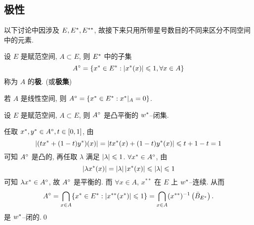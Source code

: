     \subsection{极性}
    以下讨论中因涉及 $ E, E^{*}, E^{**} $, 故接下来只用所带星号数目的不同来区分不同空间中的元素.

    \begin{Definition}[极]\label{def:极}
        设 $ E $ 是赋范空间, $ A\subset E $, 则 $ E^{*} $ 中的子集
        \[
            A^{\circ} = \{ x^{*}\in E^{*}:\left| x^{*}(x) \right| \leqslant1, \forall x\in A \}
        \]
        称为 $ A $ 的\textbf{极}. (或\textbf{极集})
    \end{Definition}

    \begin{Remark}
        若 $ A $ 是线性空间, 则 $ A^{\circ}=\{ x^{*}\in E^{*}:x^{*}|_{A}=0 \} $.
    \end{Remark}
    \begin{Proposition}\label{prop:极的w*闭性}
        设 $ E $ 是赋范空间, $ A\subset E $, 则 $ A^{\circ} $ 是凸平衡的 $ w^{*} $--闭集.
    \end{Proposition}
    \begin{Proof}
        任取 $ x^{*}, y^{*}\in A^{\circ}, t\in[0, 1] $, 由
        \[
            \left| (tx^{*}+(1-t)y^{*})(x) \right| =\left| tx^{*}(x)+(1-t)y^{*}(x) \right| \leqslant t+1-t=1
        \]
        可知 $ A^{\circ} $ 是凸的, 再任取 $ \lambda $ 满足 $ \left| \lambda \right| \leqslant1 $. $ \forall x^{*}\in A^{\circ} $, 由
        \[
            \left| \lambda x^{*}(x) \right| =\left| \lambda \right| \left| x^{*}(x) \right| \leqslant\left| \lambda \right| \leqslant1
        \]
        可知 $ \lambda x^{*}\in A^{\circ} $, 故 $ A^{\circ} $ 是平衡的. 而 $ \forall x\in A $, $ x^{**} $ 在 $ E $ 上 $ w^{*} $--连续. 从而
        \[
            A^{\circ}=\bigcap_{x\in A}\{ x^{*}\in E^{*}:\left| x^{**}(x^{*}) \right| \leqslant1 \}=\bigcap_{x\in A}(x^{**})^{-1}\left( \bar{B}_{E^{*}} \right).
        \]
        是 $ w^{*} $--闭的.\qed
    \end{Proof}

